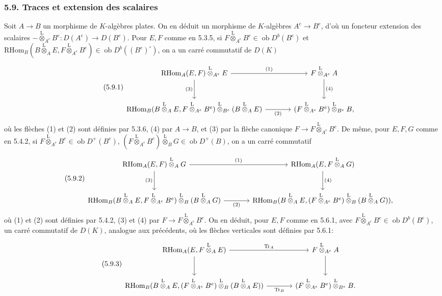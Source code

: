\documentclass[11pt]{article}
\newcommand{\ob}{\operatorname{ob}}
\providecommand{\RHom}{\mathrm{RHom}}
\providecommand{\Tr}{\operatorname{Tr}}
\providecommand{\Tr}{\operatorname{Tr}}
\providecommand{\lten}{\overset{\mathrm L}{\otimes}}
\providecommand{\Tr}{\operatorname{Tr}}
\providecommand{\RHom}{\mathrm{RHom}}
\providecommand{\ob}{\operatorname{ob}}
\providecommand{\lten}{\overset{\mathrm L}{\otimes}}
\providecommand{\RHom}{\mathrm R\mathcal{H}om}
\providecommand{\lten}{\overset{\mathrm L}{\otimes}}
\providecommand{\Tr}{\operatorname{Tr}}
\providecommand{\lten}{\overset{\mathrm L}{\otimes}}
\providecommand{\lten}{\overset{\mathrm L}{\otimes}}
\providecommand{\lten}{\overset{\mathrm L}{\otimes}}
\providecommand{\RHom}{\mathrm{RHom}}
\providecommand{\Tr}{\operatorname{Tr}}
\providecommand{\lten}{\overset{\mathrm L}{\otimes}}
\begin{document}
\subsubsection*{5.9. Traces et extension des scalaires}

Soit $A\to B$ un morphisme de $K$-algèbres plates. On en déduit un morphisme de $K$-algèbres $A^e\to B^e$, d'où un foncteur extension des scalaires $-\lten_{A^e}B^e:D(A^e)\to D(B^e)$. Pour $E,F$ comme en 5.3.5, si $F\lten_{A^e}B^e\in\ob D^b(B^e)$ et $\RHom_B(B\lten_AE,F\lten_{A^e}B^e)\in\ob D^b((B^e)^\circ)$, on a un carré commutatif de $D(K)$
\begin{equation}\tag{5.9.1}
\begin{tikzcd}[column sep=large,row sep=large]
\RHom_A(E,F)\lten_{A^e}E \arrow[r,"(1)"] \arrow[d,"(3)"'] & F\lten_{A^e}A \arrow[d,"(4)"]\\
\RHom_B(B\lten_AE,F\lten_{A^e}B^e)\lten_{B^e}(B\lten_AE) \arrow[r,"(2)"'] & (F\lten_{A^e}B^e)\lten_{B^e}B,
\end{tikzcd}
\end{equation}
où les flèches (1) et (2) sont définies par 5.3.6, (4) par $A\to B$, et (3) par la flèche canonique $F\to F\lten_{A^e}B^e$. De même, pour $E,F,G$ comme en 5.4.2, si $F\lten_{A^e}B^e\in\ob D^+(B^e)$, $(F\lten_{A^e}B^e)\lten_BG\in\ob D^+(B)$, on a un carré commutatif
\begin{equation}\tag{5.9.2}
\begin{tikzcd}[column sep=large,row sep=large]
\RHom_A(E,F)\lten_AG \arrow[r,"(1)"] \arrow[d,"(3)"'] & \RHom_A(E,F\lten_AG) \arrow[d,"(4)"]\\
\RHom_B(B\lten_AE,F\lten_{A^e}B^e)\lten_B(B\lten_AG) \arrow[r,"(2)"'] & \RHom_B(B\lten_AE,(F\lten_{A^e}B^e)\lten_B(B\lten_AG)),
\end{tikzcd}
\end{equation}
où (1) et (2) sont définies par 5.4.2, (3) et (4) par $F\to F\lten_{A^e}B^e$. On en déduit, pour $E,F$ comme en 5.6.1, avec $F\lten_{A^e}B^e\in\ob D^b(B^e)$, un carré commutatif de $D(K)$, analogue aux précédents, où les flèches verticales sont définies par 5.6.1:
\begin{equation}\tag{5.9.3}
\begin{tikzcd}[column sep=large,row sep=large]
\RHom_A(E,F\lten_AE) \arrow[r,"\Tr_A"] \arrow[d] & F\lten_{A^e}A \arrow[d]\\
\RHom_B(B\lten_AE,(F\lten_{A^e}B^e)\lten_B(B\lten_AE)) \arrow[r,"\Tr_B"'] & (F\lten_{A^e}B^e)\lten_{B^e}B.
\end{tikzcd}
\end{equation}
\end{document}
